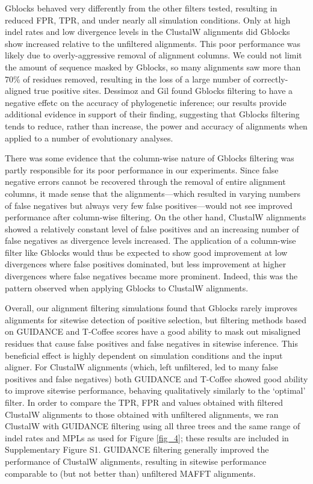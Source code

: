 \documentclass{article}
\begin{document}
Gblocks behaved very differently from the other filters tested,
resulting in reduced FPR, TPR, and \tpr under nearly all simulation
conditions. Only at high indel rates and low divergence levels in the
ClustalW alignments did Gblocks show increased \tpr relative to the
unfiltered alignments. This poor performance was likely due to
overly-aggressive removal of alignment columns. We could not limit the
amount of sequence masked by Gblocks, so many alignments saw more than
70\% of residues removed, resulting in the loss of a large number of
correctly-aligned true positive sites. Dessimoz and Gil
\citeyearpar{Dessimoz2010Phylogenetic} found Gblocks filtering to have
a negative effetc on the accuracy of phylogenetic inference; our
results provide additional evidence in support of their finding,
suggesting that Gblocks filtering tends to reduce, rather than
increase, the power and accuracy of alignments when applied to a
number of evolutionary analyses.

There was some evidence that the column-wise nature of Gblocks
filtering was partly responsible for its poor performance in our
experiments. Since false negative errors cannot be recovered through
the removal of entire alignment columns, it made sense that the
\prankc alignments---which resulted in varying numbers of false
negatives but always very few false positives---would not see improved
performance after column-wise filtering. On the other hand, ClustalW
alignments showed a relatively constant level of false positives and
an increasing number of false negatives as divergence levels
increased. The application of a column-wise filter like Gblocks would
thus be expected to show good improvement at low divergences where
false positives dominated, but less improvement at higher divergences
where false negatives became more prominent. Indeed, this was the
pattern observed when applying Gblocks to ClustalW alignments.

Overall, our alignment filtering simulations found that Gblocks rarely
improves alignments for sitewise detection of positive selection, but
filtering methods based on GUIDANCE and T-Coffee scores have a good
ability to mask out misaligned residues that cause false positives and
false negatives in sitewise inference. This beneficial effect is
highly dependent on simulation conditions and the input aligner. For
ClustalW alignments (which, left unfiltered, led to many false
positives and false negatives) both GUIDANCE and T-Coffee showed good
ability to improve sitewise performance, behaving qualitatively
similarly to the `optimal' filter. In order to compare the TPR, FPR
and \tpr values obtained with filtered ClustalW alignments to those
obtained with unfiltered alignments, we ran ClustalW with GUIDANCE
filtering using all three trees and the same range of indel rates and
MPLs as used for Figure \ref{fig_4}; these results are included in
Supplementary Figure S1. GUIDANCE filtering generally
improved the performance of ClustalW alignments, resulting in sitewise
performance comparable to (but not better than) unfiltered MAFFT
alignments.
\end{document}
